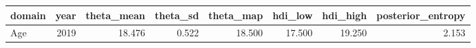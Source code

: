 \begin{tabular}{lrrrrrrr}
\toprule
domain & year & theta_mean & theta_sd & theta_map & hdi_low & hdi_high & posterior_entropy \\
\midrule
Age & 2019 & 18.476 & 0.522 & 18.500 & 17.500 & 19.250 & 2.153 \\
\bottomrule
\end{tabular}
